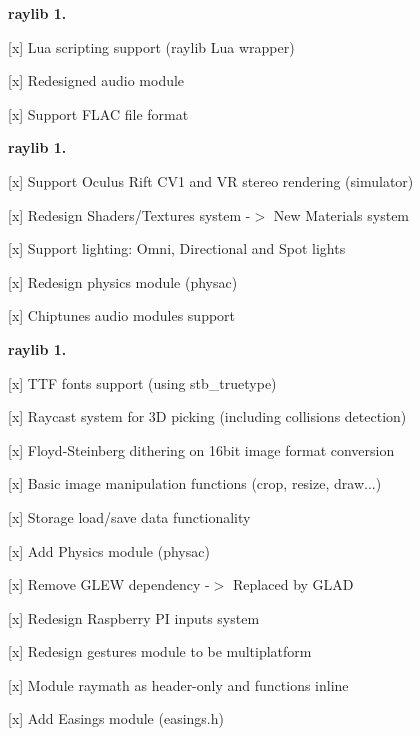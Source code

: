 {\bfseries{raylib 1.}}
\begin{DoxyItemize}
\item \mbox{[}x\mbox{]} Lua scripting support (raylib Lua wrapper)
\item \mbox{[}x\mbox{]} Redesigned audio module
\item \mbox{[}x\mbox{]} Support FLAC file format
\end{DoxyItemize}

{\bfseries{raylib 1.}}
\begin{DoxyItemize}
\item \mbox{[}x\mbox{]} Support Oculus Rift CV1 and VR stereo rendering (simulator)
\item \mbox{[}x\mbox{]} Redesign Shaders/\+Textures system -\/\texorpdfstring{$>$}{>} New Materials system
\item \mbox{[}x\mbox{]} Support lighting\+: Omni, Directional and Spot lights
\item \mbox{[}x\mbox{]} Redesign physics module (physac)
\item \mbox{[}x\mbox{]} Chiptunes audio modules support
\end{DoxyItemize}

{\bfseries{raylib 1.}}
\begin{DoxyItemize}
\item \mbox{[}x\mbox{]} TTF fonts support (using stb\+\_\+truetype)
\item \mbox{[}x\mbox{]} Raycast system for 3D picking (including collisions detection)
\item \mbox{[}x\mbox{]} Floyd-\/\+Steinberg dithering on 16bit image format conversion
\item \mbox{[}x\mbox{]} Basic image manipulation functions (crop, resize, draw...)
\item \mbox{[}x\mbox{]} Storage load/save data functionality
\item \mbox{[}x\mbox{]} Add Physics module (physac)
\item \mbox{[}x\mbox{]} Remove GLEW dependency -\/\texorpdfstring{$>$}{>} Replaced by GLAD
\item \mbox{[}x\mbox{]} Redesign Raspberry PI inputs system
\item \mbox{[}x\mbox{]} Redesign gestures module to be multiplatform
\item \mbox{[}x\mbox{]} Module raymath as header-\/only and functions inline
\item \mbox{[}x\mbox{]} Add Easings module (easings.\+h) 
\end{DoxyItemize}